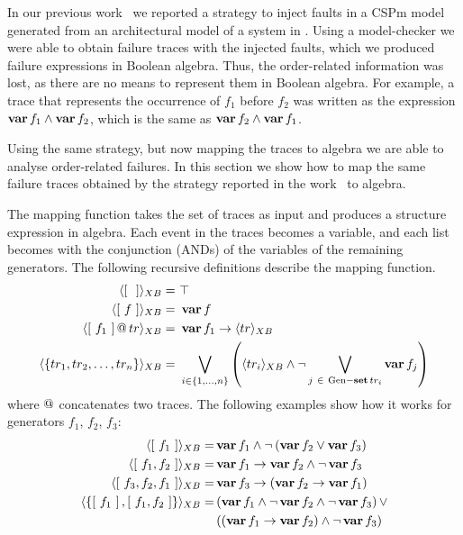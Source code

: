 In our previous work~\cite{DM2012,Didier2012} we reported a strategy to inject faults in a \ac{CSPm} model generated from an architectural model of a system in \simulink.
Using a model-checker we were able to obtain failure traces with the injected faults, which we produced failure expressions in Boolean algebra.
Thus, the order-related information was lost, as there are no means to represent them in Boolean algebra.
For example, a trace that represents the occurrence of $f_1$ before $f_2$ was written as the expression $\operatorname{\mathbf{var}} f_1 \land \operatorname{\mathbf{var}} f_2$, which is the same as $\operatorname{\mathbf{var}} f_2 \land \operatorname{\mathbf{var}} f_1$.

Using the same strategy, but now mapping the traces to \ac{algebra} we are able to analyse order-related failures.
In this section we show how to map the same failure traces obtained by the strategy reported in the work~\cite{DM2012} to \ac{algebra}.

The mapping function takes the set of traces as input and produces a structure expression in \ac{algebra}.
Each event in the traces becomes a variable, and each list becomes  with the conjunction (\acp{AND}) of the variables of the remaining generators.
The following recursive definitions describe the mapping function.
%
\begin{subequations}
\begin{align}
\tracetoalgebra{\trace{}} = &~ \top\label{eq:mapping-algebra-empty}\\
%
\tracetoalgebra{\trace{f}} = &~ \var{f}\label{eq:mapping-algebra-singleton}\\
%
\tracetoalgebra{\append{\trace{f_1}}{tr}} = &~
  \xbefore
    {\var{f_1}}
    {\tracetoalgebra{tr}}\label{eq:mapping-algebra-two-more-trace}\\
%
\tracetoalgebra{\left\{ tr_1, tr_2, \ldots, tr_n  \right\}} =&~ 
  \bigvee_{i \in \left\{1,\ldots,n\right\}} 
  \left(\tracetoalgebra{tr_i} \land 
  \lnot \bigvee_{j ~\in~ \generators - \listset{tr_i}} \var{f_j}\right)\label{eq:mapping-algebra-set}
\end{align}
\end{subequations}
%
where $\operatorname{\mathbf{@}}$ concatenates two traces.
The following examples show how it works for generators $f_1$, $f_2$, $f_3$:
%
\begin{subequations}
\begin{align}
\tracetoalgebra{\trace{f_1}} = & \var{f_1} \land \lnot \left(\var{f_2} \lor \var{f_3}\right)\\
%
\tracetoalgebra{\trace{f_1,f_2}} = & \xbefore{\var{f_1}}{\var{f_2}} \land \lnot \var{f_3}\\
%
\tracetoalgebra{\trace{f_3,f_2,f_1}} = & \xbefore{\var{f_3}}{\left(\xbefore{\var{f_2}}{\var{f_1}}\right)}\\
%
\tracetoalgebra{\left\{\trace{f_1},\trace{f_1,f_2}\right\}} = & 
  \left(\var{f_1} \land \lnot \var{f_2} \land \lnot \var{f_3}\right) \lor \nonumber\\
  & \left(\left(\xbefore{\var{f_1}}{\var{f_2}}\right) \land \lnot \var{f_3}\right)
\end{align}
\end{subequations}

